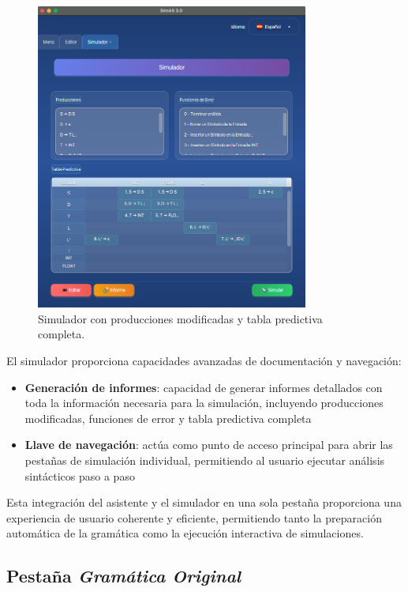 \needspace{8cm}
\begin{figure}[H]
\centering
\includegraphics[width=0.8\textwidth]{figuras2/simulador/simulador.png}
\caption{Simulador con producciones modificadas y tabla predictiva completa.}
\label{fig:simulador}
\end{figure}

El simulador proporciona capacidades avanzadas de documentación y navegación:

\begin{itemize}
 \item \textbf{Generación de informes}: capacidad de generar informes detallados con toda la información necesaria para la simulación, incluyendo producciones modificadas, funciones de error y tabla predictiva completa
 \item \textbf{Llave de navegación}: actúa como punto de acceso principal para abrir las pestañas de simulación individual, permitiendo al usuario ejecutar análisis sintácticos paso a paso
\end{itemize}

Esta integración del asistente y el simulador en una sola pestaña proporciona una experiencia de usuario coherente y eficiente, permitiendo tanto la preparación automática de la gramática como la ejecución interactiva de simulaciones.

\subsection{Pestaña \textit{Gramática Original}}


